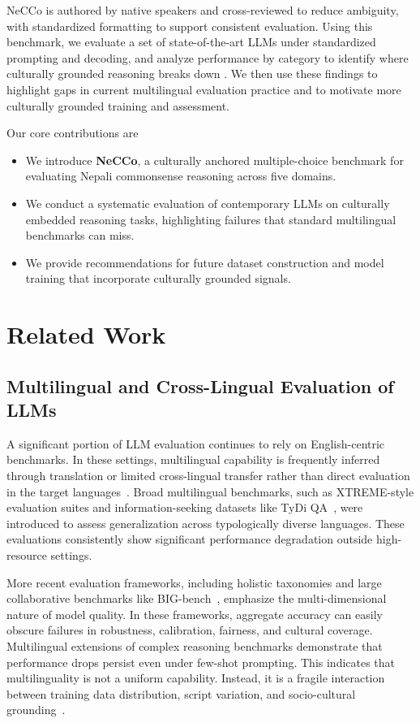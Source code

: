 \documentclass[10pt, a4paper]{article}
\begin{document}
NeCCo is authored by native speakers and cross-reviewed to reduce ambiguity, with standardized formatting to support consistent evaluation. Using this benchmark, we evaluate a set of state-of-the-art LLMs under standardized prompting and decoding, and analyze performance by category to identify where culturally grounded reasoning breaks down \cite{thapa2025probing}. We then use these findings to highlight gaps in current multilingual evaluation practice and to motivate more culturally grounded training and assessment.

Our core contributions are
\begin{itemize}
    \item We introduce \textbf{NeCCo}, a culturally anchored multiple-choice benchmark for evaluating Nepali commonsense reasoning across five domains.
    \item We conduct a systematic evaluation of contemporary LLMs on culturally embedded reasoning tasks, highlighting failures that standard multilingual benchmarks can miss.
    \item We provide recommendations for future dataset construction and model training that incorporate culturally grounded signals.
\end{itemize}

\section{Related Work}


\subsection{Multilingual and Cross-Lingual Evaluation of LLMs}
A significant portion of LLM evaluation continues to rely on English-centric benchmarks. In these settings, multilingual capability is frequently inferred through translation or limited cross-lingual transfer rather than direct evaluation in the target languages~\cite{clark2020tydi}. Broad multilingual benchmarks, such as XTREME-style evaluation suites and information-seeking datasets like TyDi QA~\cite{clark2020tydi}, were introduced to assess generalization across typologically diverse languages. These evaluations consistently show significant performance degradation outside high-resource settings.

More recent evaluation frameworks, including holistic taxonomies and large collaborative benchmarks like BIG-bench~\cite{kazemi2025big}, emphasize the multi-dimensional nature of model quality. In these frameworks, aggregate accuracy can easily obscure failures in robustness, calibration, fairness, and cultural coverage. Multilingual extensions of complex reasoning benchmarks demonstrate that performance drops persist even under few-shot prompting. This indicates that multilinguality is not a uniform capability. Instead, it is a fragile interaction between training data distribution, script variation, and socio-cultural grounding~\cite{clark2020tydi}.
\end{document}

